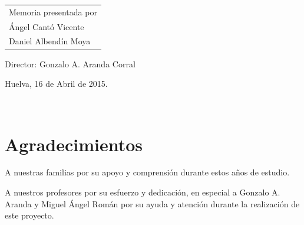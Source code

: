 \vspace*{4cm}

\vfill


\hspace*{.5\textwidth}
\normalsize
\begin{tabular}{l}
Memoria presentada por\\
Ángel Cantó Vicente\\
Daniel Albendín Moya\\


\end{tabular} \par


Director:
Gonzalo A. Aranda Corral\newline

Huelva, 16 de Abril de 2015.


%
%
%
%
%
%

\newpage
\thispagestyle{empty}
\mbox{ }



\newpage
\chapter*{Agradecimientos}
\thispagestyle{empty}

A nuestras familias por su apoyo y comprensión durante estos años de estudio.

A nuestros profesores por su esfuerzo y dedicación, en especial a Gonzalo A. Aranda y Miguel Ángel Román por su ayuda y atención durante la realización de este proyecto.


\newpage
\thispagestyle{empty}
\mbox{ }
\clearpage



